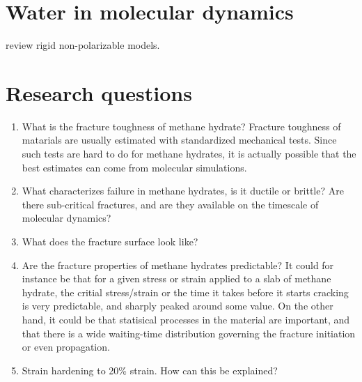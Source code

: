 \section{Water in molecular dynamics}
\citet{Vega2011} review rigid non-polarizable models.

\section{Research questions}
\begin{enumerate}
\item What is the fracture toughness of methane hydrate? Fracture toughness of matarials are usually estimated with standardized mechanical tests. Since such tests are hard to do for methane hydrates, it is actually possible that the best estimates can come from molecular simulations. 
\item What characterizes failure in methane hydrates, is it ductile or brittle? Are there sub-critical fractures, and are they available on the timescale of molecular dynamics?
\item What does the fracture surface look like?
\item Are the fracture properties of methane hydrates predictable? It could for instance be that for a given stress or strain applied to a slab of methane hydrate, the critial stress/strain or the time it takes before it starts cracking is very predictable, and sharply peaked around some value. On the other hand, it could be that statisical processes in the material are important, and that there is a wide waiting-time distribution governing the fracture initiation or even propagation.
\item Strain hardening to 20\% strain. How can this be explained?
\end{enumerate}